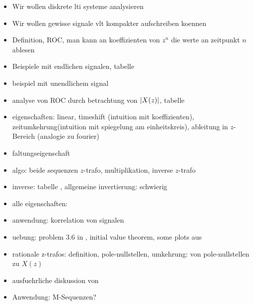 \begin{itemize}
    \item Wir wollen diskrete \gls{lti} systeme analysieren
    \item Wir wollen gewisse signale vlt kompakter aufschreiben koennen
    \item Definition, ROC, man kann an koeffizienten von $z^n$ die werte an zeitpunkt $n$ ablesen
    \item Beispiele mit endlichen signalen, tabelle \cite[p155, top]{proakis2013}
    \item beispiel mit unendlichem signal
    \item analyse von ROC durch betrachtung von ${\left| X(z) \right|}$, tabelle \cite[p155, top]{proakis2013}
    \item eigenschaften: linear, timeshift (intuition mit koeffizienten), zeitumkehrung(intuition mit spiegelung am einheitskreis), ableitung in $z$-Bereich (analogie zu fourier)
    \item faltungseigenschaft
    \item algo: beide sequenzen $z$-trafo, multiplikation, inverse $z$-trafo
    \item inverse: tabelle \cite[tabelle 3.3]{proakis2013}, allgemeine invertierung: schwierig
    \item alle eigenschaften: \cite[tabelle 3.2]{proakis2013}
    \item anwendung: korrelation von signalen
    \item uebung: problem 3.6 in \cite{proakis2013}, initial value theorem, some plots aus \cite{proakis2013}
    \item rationale z-trafos: definition, pole-nullstellen, umkehrung: von pole-nullstellen zu $X(z)$
    \item ausfuehrliche diskussion von \cite[fig 3.3.5, 3.3.6]{proakis2013} 
    \item Anwendung: M-Sequenzen?
\end{itemize}

